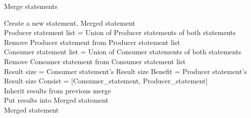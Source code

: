 \documentclass[a4paper]{article}
\begin{document}
\begin{algorithm}
\caption{Merge statements}
\begin{algorithmic}

    \State Create a new statement, Merged statement
    \\
    \State Producer statement list = Union of Producer statements of both statements
    \State Remove Producer statement from Producer statement list
    \\
    \State Consumer statement list = Union of Consumer statements of both statements
    \State Remove Consumer statement from Consumer statement list
    \\
    \State Result size = Consumer statement's Result size
    \State Benefit = Producer statement's Result size
    \State Consist = [Consumer\_statement, Producer\_statement]
    \\
        \State Inherit results from previous merge
    \EndIf
    \\
    \State Put results into Merged statement
    \\
    \Return Merged statement

\EndProcedure

\end{algorithmic}
\end{algorithm}
\end{document}
